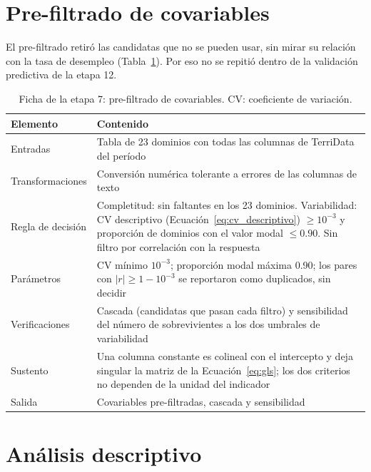 \section{Pre-filtrado de covariables}
\label{sec:met_prefiltrado}

El pre-filtrado retiró las candidatas que no se pueden usar, sin mirar su relación con la tasa de desempleo (Tabla~\ref{tab:met_prefiltrado}). Por eso no se repitió dentro de la validación predictiva de la etapa 12.

\begin{table}[!htbp]
\centering
\small
\caption[Ficha de la etapa 7: pre-filtrado de covariables]{Ficha de la etapa 7: pre-filtrado de covariables. CV: coeficiente de variación.}
\label{tab:met_prefiltrado}
\renewcommand{\arraystretch}{1.15}
\begin{tabularx}{\linewidth}{>{\raggedright\arraybackslash}p{2.8cm} >{\raggedright\arraybackslash}X}
\toprule
Elemento & Contenido \\
\midrule
Entradas & Tabla de 23 dominios con todas las columnas de TerriData del período \\
Transformaciones & Conversión numérica tolerante a errores de las columnas de texto \\
Regla de decisión & Completitud: sin faltantes en los 23 dominios. Variabilidad: CV descriptivo (Ecuación~\ref{eq:cv_descriptivo}) $\geq 10^{-3}$ y proporción de dominios con el valor modal $\leq 0.90$. Sin filtro por correlación con la respuesta \\
Parámetros & CV mínimo $10^{-3}$; proporción modal máxima 0.90; los pares con $|r| \geq 1 - 10^{-3}$ se reportaron como duplicados, sin decidir \\
Verificaciones & Cascada (candidatas que pasan cada filtro) y sensibilidad del número de sobrevivientes a los dos umbrales de variabilidad \\
Sustento & Una columna constante es colineal con el intercepto y deja singular la matriz de la Ecuación~\ref{eq:gls}; los dos criterios no dependen de la unidad del indicador \\
Salida & Covariables pre-filtradas, cascada y sensibilidad \\
\bottomrule
\end{tabularx}
\end{table}

\section{Análisis descriptivo}
\label{sec:met_descriptivo}

